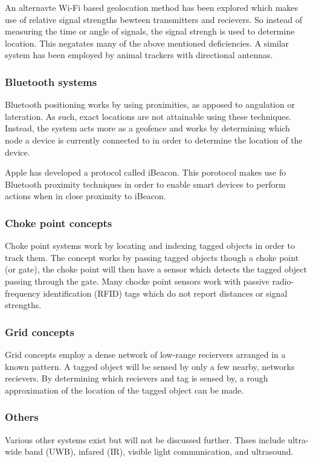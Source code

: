 \documentclass[11pt,a4paper]{article}
\begin{document}
		An alternavte Wi-Fi based geolocation method has been explored which makes use of relative signal strengths bewteen transmitters and recievers. So instead of measuring the time or angle of signals, the signal strengh is used to determine location. This negatates many of the above mentioned deficiencies. A similar system has been employed by animal trackers with directional antennas.
		\cite{yongguang_chen_signal_2002}
	
	\subsubsection{Bluetooth systems}
		Bluetooth positioning works by using proximities, as apposed to angulation or lateration. As such, exact locations are not attainable using these techniques. Instead, the system acts more as a geofence and works by determining which node a device is currently connected to in order to determine the location of the device.
	
		Apple has developed a protocol called iBeacon. This porotocol makes use fo Bluetooth proximity techniques in order to enable smart devices to perform actions when in close proximity to iBeacon.
		\cite{_everything_????}
	
	\subsubsection{Choke point concepts}
		Choke point systems work by locating and indexing tagged objects in order to track them. The concept works by passing tagged objects though a choke point (or gate), the choke point will then have a sensor which detects the tagged object passing through the gate. Many chocke point sensors work with passive radio-frequency identification (RFID) tags which do not report distances or signal strengths.
		\cite{reza_investigation_2008}
	
	\subsubsection{Grid concepts}
		Grid concepts employ a dense network of low-range reciervers arranged in a known pattern. A tagged object will be sensed by only a few nearby, networks recievers. By determining which recievers and tag is sensed by, a rough approximation of the location of the tagged object can be made.
	
	\subsubsection{Others}
		Various other systems exist but will not be discussed further. Thses include ultra-wide band (UWB), infared (IR), visible light communication, and ultrasound.
	
\end{document}
